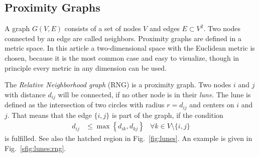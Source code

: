 \documentclass[pre,twocolumn,groupedaddress,showpacs,showkeys,amsmath,amssymb,floatfix]{revtex4-1}
\begin{document}
        \subsection{Proximity Graphs}
        \label{ssec:graphtypes}
            A graph \(G(V,E)\) consists of a set of nodes \(V\) and edges \(E \subset V^{2}\).
            Two nodes connected by an edge are called neighbors.
            Proximity graphs are defined in a metric space. In this article a
            two-dimensional space with the Euclidean metric is chosen, because
            it is the most common case and easy to visualize, though in principle
            every metric in any dimension can be used.

            The \emph{Relative Neighborhood graph} (RNG) \cite{Toussaint1980} is
            a proximity graph. Two nodes \(i\) and \(j\) with distance $d_{ij}$
            will be connected, if no other node is in their \emph {lune}. The lune
            is defined as the intersection of two circles with radius \(r =
            d_{ij}\) and centers on \(i\) and \(j\). That means that the edge
            $\{i,j\}$ is part of the graph, if the condition
            \begin{align*}
                d_{ij} &\le \max\left\{ d_{ik}, d_{kj} \right\} &\forall k \in V\setminus\{i,j\}
            \end{align*}
            is fulfilled. See also the hatched region
            in Fig.~\ref{fig:lunes}. An example is given in Fig.~\ref{sfig:lunes:rng}.
\end{document}
